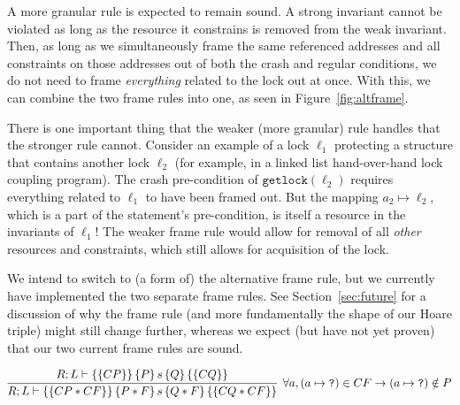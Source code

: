 A more granular rule is expected to remain sound.
A strong invariant cannot be
violated as long as the resource it constrains is removed from the weak
invariant.
Then, as long as we simultaneously frame the same referenced
addresses and all constraints on those addresses out of both the crash and
regular conditions, we do not need to frame \textit{everything} related to the
lock out at once.
With this, we can combine the two frame rules into one, as
seen in Figure~\ref{fig:altframe}.


There is one important thing that the weaker (more granular) rule handles that
the stronger rule cannot.
Consider an example of a lock $\ell_1$ protecting a
structure that contains another lock $\ell_2$ (for example, in a linked list
hand-over-hand lock coupling program).
The crash pre-condition of
$\texttt{getlock}(\ell_2)$ requires everything related to $\ell_1$ to have been
framed out.
But the mapping $a_2\mapsto\ell_2$, which is a part of the
statement's pre-condition, is itself a resource in the invariants of $\ell_1$!
The weaker frame rule would allow for removal of all \textit{other} resources
and constraints, which still allows for acquisition of the lock.

We intend to switch to (a form of) the alternative frame rule, but we currently
have implemented the two separate frame rules.
See Section~\ref{sec:future} for a discussion
of why the frame rule (and more fundamentally the shape of our Hoare triple)
might still change further, whereas we expect (but have not yet proven) that
our two current frame rules are sound.

\begin{figure*}
\begin{gather*}
    \infer[\forall a, (a \mapsto\texttt{?}) \in CF \imp
    (a\mapsto\texttt{?}) \notin P]
	{\hoarestmt{R}{L}{CP * CF}{P * F}{s}{Q * F}{CQ * CF}}
	{\hoarestmt{R}{L}{CP}{P}{s}{Q}{CQ}}
\end{gather*}
\caption{Alternative frame rule}
\label{fig:altframe}
\end{figure*}

